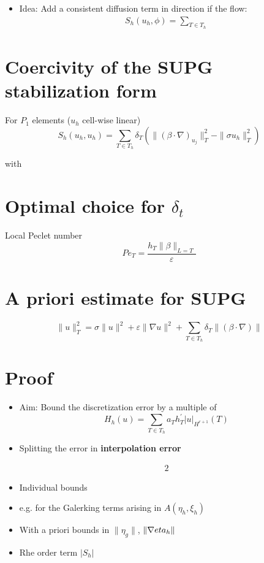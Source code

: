 \documentclass[openany,a4paper,11pt]{memoir}
\theoremstyle{definition}
\begin{document}
\begin{itemize}
\item Idea: Add a consistent diffusion term in direction if the flow:
  \begin{align*}
    S_h(u_h,\phi)=\sum_{T\in T_h}
  \end{align*}
\end{itemize}

\section{Coercivity of the SUPG stabilization form}

For $P_1$ elements ($u_h$ cell-wise linear)
\[ S_h(u_h,u_h)=\sum_{T\in T_h}\delta_T(\|(\beta\cdot\nabla)_{u_j}\|^2_T - \|\sigma u_h\|^2_T) \]

with

\section{Optimal choice for $\delta_t$}

Local Peclet number \[ Pe_T =\frac{h_T\|\beta\|_{L=T}}{\varepsilon}\]

\section{A priori estimate for SUPG}

\[ \|u\|^2_T = \sigma\|u\|^2+\varepsilon\|\nabla u\| ^2+\sum_{T\in T_h}\delta_T\|(\beta\cdot\nabla)\|\]

\section{Proof}

\begin{itemize}
\item Aim: Bound the discretization error by a multiple of \[ H_h(u)=\sum_{T\in T_h}a_Th^\prime_T|u|_{H^{r+1}}(T) \]
  
\item Splitting the error in \textbf{interpolation error}

  \begin{align*}
    2
  \end{align*}


  
\item Individual bounds
  
\item e.g. for the Galerking terms arising in $A(\eta_h,\xi_h)$
  
\item With a priori bounds in $\|\eta_g\|$, $\|\nabla\\eta_h\|$
  
\item Rhe order term $|S_h|$
\end{itemize}
\end{document}
